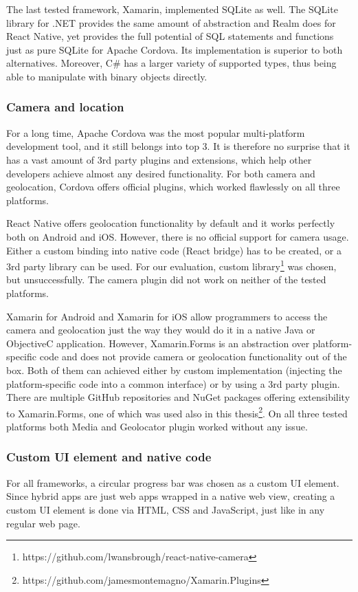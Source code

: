 \documentclass[english,master,public,dept460,male,cpdeclaration,oneside]{diploma}
\begin{document}
The last tested framework, Xamarin, implemented SQLite as well. The SQLite library for .NET provides the same amount of abstraction and Realm does for React Native, yet provides the full potential of SQL statements and functions just as pure SQLite for Apache Cordova. Its implementation is superior to both alternatives. Moreover, C\# has a larger variety of supported types, thus being able to manipulate with binary objects directly.

\subsubsection{Camera and location}
For a long time, Apache Cordova was the most popular multi-platform development tool, and it still belongs into top 3. It is therefore no surprise that it has a vast amount of 3rd party plugins and extensions, which help other developers achieve almost any desired functionality. For both camera and geolocation, Cordova offers official plugins, which worked flawlessly on all three platforms.

React Native offers geolocation functionality by default and it works perfectly both on Android and iOS. However, there is no official support for camera usage. Either a custom binding into native code (React bridge) has to be created, or a 3rd party library can be used. For our evaluation, custom library\footnote{https://github.com/lwansbrough/react-native-camera} was chosen, but unsuccessfully. The camera plugin did not work on neither of the tested platforms.

Xamarin for Android and Xamarin for iOS allow programmers to access the camera and geolocation just the way they would do it in a native Java or ObjectiveC application. However, Xamarin.Forms is an abstraction over platform-specific code and does not provide camera or geolocation functionality out of the box. Both of them can achieved either by custom implementation (injecting the platform-specific code into a common interface) or by using a 3rd party plugin. There are multiple GitHub repositories and NuGet packages offering extensibility to Xamarin.Forms, one of which was used also in this thesis\footnote{https://github.com/jamesmontemagno/Xamarin.Plugins}. On all three tested platforms both Media and Geolocator plugin worked without any issue. 

\subsubsection{Custom UI element and native code}
For all frameworks, a circular progress bar was chosen as a custom UI element. Since hybrid apps are just web apps wrapped in a native web view, creating a custom UI element is done via HTML, CSS and JavaScript, just like in any regular web page. 
\end{document}
